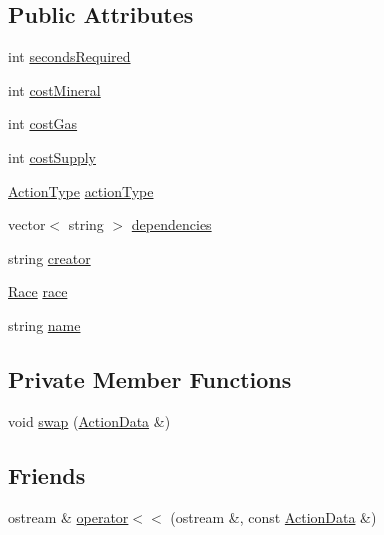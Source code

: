 \subsection*{Public Attributes}
\begin{DoxyCompactItemize}
\item 
int \hyperlink{structghost_1_1ActionData_a7ff20dbecf38edc51e5ed22c4fb4185f}{seconds\-Required}
\item 
int \hyperlink{structghost_1_1ActionData_aea11f5a509938083df28e21c6f753166}{cost\-Mineral}
\item 
int \hyperlink{structghost_1_1ActionData_a72fd3aaa2d8f6ba894a4f0b510cb1e9c}{cost\-Gas}
\item 
int \hyperlink{structghost_1_1ActionData_a2e6e75207eaf7385ba218e1a6edd195d}{cost\-Supply}
\item 
\hyperlink{namespaceghost_a7c0deb8266504feb7d025903f2b77693}{Action\-Type} \hyperlink{structghost_1_1ActionData_ae45a131006520b3d63e005c64aeed7fb}{action\-Type}
\item 
vector$<$ string $>$ \hyperlink{structghost_1_1ActionData_a1944375640866259ba0bbc4c2a0be9be}{dependencies}
\item 
string \hyperlink{structghost_1_1ActionData_ad611d6733b1b9212a7da8e96ebc4d43d}{creator}
\item 
\hyperlink{namespaceghost_a8b1db75c40c6980adcf244ddccc0324b}{Race} \hyperlink{structghost_1_1ActionData_a9dc614c3bcd09ba461e5d4752c4abbc0}{race}
\item 
string \hyperlink{structghost_1_1ActionData_afadde6e57871331f04ebd051bd167285}{name}
\end{DoxyCompactItemize}
\subsection*{Private Member Functions}
\begin{DoxyCompactItemize}
\item 
void \hyperlink{structghost_1_1ActionData_ac049b0b6c1038dd53c67fc366c1a660b}{swap} (\hyperlink{structghost_1_1ActionData}{Action\-Data} \&)
\end{DoxyCompactItemize}
\subsection*{Friends}
\begin{DoxyCompactItemize}
\item 
ostream \& \hyperlink{structghost_1_1ActionData_a6da0a336863ebac3493d4a046ab73cb2}{operator$<$$<$} (ostream \&, const \hyperlink{structghost_1_1ActionData}{Action\-Data} \&)
\end{DoxyCompactItemize}


